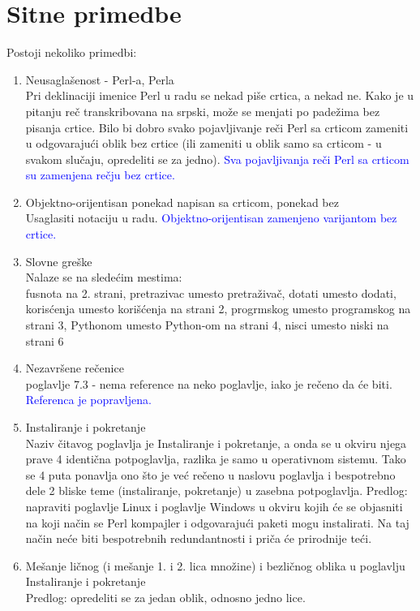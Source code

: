 \documentclass[a4paper]{report}
\newcommand{\odgovor}[1]{\textcolor{blue}{#1}}
\begin{document}
\section{Sitne primedbe}	
Postoji nekoliko primedbi:
\begin{enumerate}
\item Neusaglašenost - Perl-a, Perla\\
Pri deklinaciji imenice Perl u radu se nekad piše crtica, a nekad ne. Kako je u pitanju reč transkribovana na srpski, može se menjati po padežima bez pisanja crtice. Bilo bi dobro svako pojavljivanje reči Perl sa crticom zameniti u odgovarajući oblik bez crtice (ili zameniti u oblik samo sa crticom - u svakom slučaju, opredeliti se za jedno).
\odgovor{ Sva pojavljivanja reči Perl sa crticom su zamenjena rečju bez crtice. }
\item Objektno-orijentisan ponekad napisan sa crticom, ponekad bez\\
Usaglasiti notaciju u radu.
\odgovor{ Objektno-orijentisan zamenjeno varijantom bez crtice. }
\item Slovne greške\\
Nalaze se na sledećim mestima:\\
fusnota na 2. strani,
pretrazivac umesto pretraživač, dotati umesto dodati, korisćenja umesto korišćenja na strani 2,
progrmskog umesto programskog na strani 3,
Pythonom umesto Python-om na strani 4,
nisci umesto niski na strani 6
\item Nezavršene rečenice\\
poglavlje 7.3 - nema reference na neko poglavlje, iako je rečeno da će biti.
\odgovor{ Referenca je popravljena. }
\item Instaliranje i pokretanje\\
Naziv čitavog poglavlja je Instaliranje i pokretanje, a onda se u okviru njega prave 4 identična potpoglavlja, razlika je samo u operativnom sistemu. Tako se 4 puta ponavlja ono što je već rečeno u naslovu poglavlja i bespotrebno dele 2 bliske teme (instaliranje, pokretanje) u zasebna potpoglavlja.
Predlog: napraviti poglavlje Linux i poglavlje Windows u okviru kojih će se objasniti na koji način se Perl kompajler i odgovarajući paketi mogu instalirati. Na taj način neće biti bespotrebnih redundantnosti i priča će prirodnije teći.
\item Mešanje ličnog (i mešanje 1. i 2. lica množine) i bezličnog oblika u poglavlju Instaliranje i pokretanje\\
Predlog: opredeliti se za jedan oblik, odnosno jedno lice.
\end{enumerate}
\end{document}
